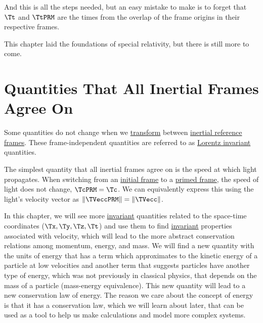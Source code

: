 And this is all the steps needed, but an easy mistake to make is to forget that ${\Tt }$ and $\TtPRM $ are the times from the overlap of the frame origins in their respective frames.

This chapter laid the foundations of special relativity, but there is still more to come.

%

\printbibliography[segment=\therefsegment, heading=subbibliography]

\chapter{Quantities That All Inertial Frames Agree On} \label{ch: Invariant Quantities}

Some quantities do not change when we \hyperlink{def-transform}{transform} between \hyperlink{def-Inertial-reference-frame}{inertial reference frames}.
These frame-independent quantities are referred to as \hyperlink{def-lorentz-invariant}{Lorentz invariant} quantities.

The simplest quantity that all inertial frames agree on is the speed at which light propagates.
When switching from an \hyperlink{def-initial-Frame}{initial frame} to a \hyperlink{def-Primed-Frame}{primed frame}, the speed of light does not change, $\TcPRM =\Tc $.
We can equivalently express this using the light's velocity vector as $\|\TVeccPRM \|=\|\TVecc \|$.

In this chapter, we will see more \hyperlink{def-lorentz-invariant}{invariant} quantities related to the space-time coordinates ($\Tx ,\Ty ,\Tz ,\Tt $) and use them to find \hyperlink{def-lorentz-invariant}{invariant} properties associated with velocity, which will lead to the more abstract conservation relations among momentum, energy, and mass.
We will find a new quantity with the units of energy that has a term which approximates to the kinetic energy of a particle at low velocities and another term that suggests particles have another type of energy, which was not previously in classical physics, that depends on the mass of a particle (mass-energy equivalence).
This new quantity will lead to a new conservation law of energy.
The reason we care about the concept of energy is that it has a conservation law, which we will learn about later, that can be used as a tool to help us make calculations and model more complex systems.

